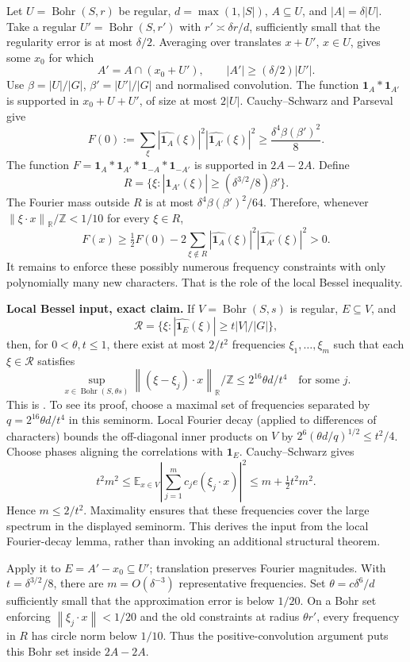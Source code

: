 \documentclass[11pt,a4paper]{article}
\newcommand{\E}{\mathbb E}
\newcommand{\T}{\mathbb R/\mathbb Z}
\newcommand{\Bohr}{\operatorname{Bohr}}
\newcommand{\abs}[1]{\left|#1\right|}
\newcommand{\norm}[1]{\left\|#1\right\|}
\newcommand{\GT}[1]{\cite[#1]{GT}}
\theoremstyle{definition}
\numberwithin{equation}{section}
\begin{document}
Let $U=\Bohr(S,r)$ be regular, $d=\max(1,|S|)$,
$A\subseteq U$, and $|A|=\delta|U|$. Take a regular
$U'=\Bohr(S,r')$ with $r'\asymp\delta r/d$, sufficiently small that
the regularity error is at most $\delta/2$. Averaging over translates
$x+U'$, $x\in U$, gives some $x_0$ for which
\[A'=A\cap(x_0+U'),\qquad |A'|\geq(\delta/2)|U'|.\]
Use $\beta=|U|/|G|$, $\beta'=|U'|/|G|$ and normalised convolution.
The function $\mathbf1_A*\mathbf1_{A'}$ is supported in
$x_0+U+U'$, of size at most $2|U|$. Cauchy--Schwarz and Parseval give
\[
F(0):=\sum_\xi|\widehat{\mathbf1_A}(\xi)|^2
                         |\widehat{\mathbf1_{A'}}(\xi)|^2
\geq\frac{\delta^4\beta(\beta')^2}{8}.
\]
The function
$F=\mathbf1_A*\mathbf1_{A'}*\mathbf1_{-A}*\mathbf1_{-A'}$
is supported in $2A-2A$. Define
\[R=\{\xi:|\widehat{\mathbf1_{A'}}(\xi)|\geq
                       (\delta^{3/2}/8)\beta'\}.\]
The Fourier mass outside $R$ is at most
$\delta^4\beta(\beta')^2/64$. Therefore, whenever
$\norm{\xi\cdot x}_\T<1/10$ for every $\xi\in R$,
\[
F(x)\geq\tfrac12F(0)-2\sum_{\xi\notin R}
|\widehat{\mathbf1_A}(\xi)|^2|\widehat{\mathbf1_{A'}}(\xi)|^2>0.
\]
It remains to enforce these possibly numerous frequency constraints with
only polynomially many new characters. That is the role of the local
Bessel inequality.

\textbf{Local Bessel input, exact claim.}
If $V=\Bohr(S,s)$ is regular, $E\subseteq V$, and
\[\mathcal R=\{\xi:|\widehat{\mathbf1_E}(\xi)|\geq t|V|/|G|\},\]
then, for $0<\theta,t\leq1$, there exist at most $2/t^2$ frequencies
$\xi_1,\ldots,\xi_m$ such that each $\xi\in\mathcal R$ satisfies
\[\sup_{x\in\Bohr(S,\theta s)}
\norm{(\xi-\xi_j)\cdot x}_\T\leq2^{16}\theta d/t^4
\quad\text{for some }j.\]
This is \GT{Corollary 8.7}. To see its proof, choose a maximal set of
frequencies separated by $q=2^{16}\theta d/t^4$ in this seminorm.
Local Fourier decay (applied to differences of characters) bounds the
off-diagonal inner products on $V$ by
$2^6(\theta d/q)^{1/2}\leq t^2/4$.
Choose phases aligning the correlations with $\mathbf1_E$.
Cauchy--Schwarz gives
\[t^2m^2\leq\E_{x\in V}\abs{\sum_{j=1}^m c_j e(\xi_j\cdot x)}^2
\leq m+\tfrac12t^2m^2.\]
Hence $m\leq2/t^2$. Maximality ensures that these frequencies cover
the large spectrum in the displayed seminorm. This derives the input
from the local Fourier-decay lemma, rather than invoking an additional
structural theorem.

Apply it to $E=A'-x_0\subseteq U'$; translation preserves Fourier
magnitudes. With $t=\delta^{3/2}/8$, there are
$m=O(\delta^{-3})$ representative frequencies. Set
$\theta=c\delta^6/d$ sufficiently small that the approximation error
is below $1/20$. On a Bohr set enforcing $\norm{\xi_j\cdot x}<1/20$
and the old constraints at radius $\theta r'$, every frequency in $R$
has circle norm below $1/10$. Thus the positive-convolution argument
puts this Bohr set inside $2A-2A$.
\end{document}
